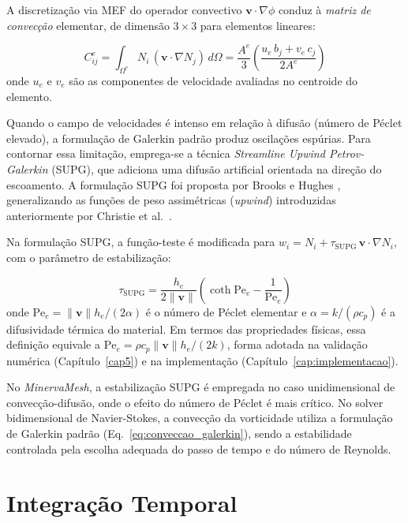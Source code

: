 A discretização via MEF do operador convectivo $\mathbf{v} \cdot \nabla \phi$ conduz à \textit{matriz de convecção} elementar, de dimensão $3 \times 3$ para elementos lineares:

\begin{equation}
C_{ij}^e = \int_{\Omega^e} N_i \, (\mathbf{v} \cdot \nabla N_j) \, d\Omega = \frac{A^e}{3} \left( \frac{u_e \, b_j + v_e \, c_j}{2 A^e} \right)
\label{eq:conveccao_galerkin}
\end{equation}
onde $u_e$ e $v_e$ são as componentes de velocidade avaliadas no centroide do elemento.

Quando o campo de velocidades é intenso em relação à difusão (número de Péclet elevado), a formulação de Galerkin padrão produz oscilações espúrias. Para contornar essa limitação, emprega-se a técnica \textit{Streamline Upwind Petrov-Galerkin} (SUPG), que adiciona uma difusão artificial orientada na direção do escoamento. A formulação SUPG foi proposta por Brooks e Hughes \cite{Brooks1982}, generalizando as funções de peso assimétricas (\textit{upwind}) introduzidas anteriormente por Christie et al.\ \cite{Christie1976}.

Na formulação SUPG, a função-teste é modificada para $w_i = N_i + \tau_{\text{SUPG}} \, \mathbf{v} \cdot \nabla N_i$, com o parâmetro de estabilização:

\begin{equation}
\tau_{\text{SUPG}} = \frac{h_e}{2 \|\mathbf{v}\|} \left( \coth \text{Pe}_e - \frac{1}{\text{Pe}_e} \right)
\label{eq:tau_supg}
\end{equation}
onde $\text{Pe}_e = \|\mathbf{v}\| h_e / (2\alpha)$ é o número de Péclet elementar e $\alpha = k/(\rho c_p)$ é a difusividade térmica do material. Em termos das propriedades físicas, essa definição equivale a $\text{Pe}_e = \rho c_p \|\mathbf{v}\| h_e / (2k)$, forma adotada na validação numérica (Capítulo~\ref{cap5}) e na implementação (Capítulo~\ref{cap:implementacao}).

No \textit{MinervaMesh}, a estabilização SUPG é empregada no caso unidimensional de convecção-difusão, onde o efeito do número de Péclet é mais crítico. No solver bidimensional de Navier-Stokes, a convecção da vorticidade utiliza a formulação de Galerkin padrão (Eq.~\ref{eq:conveccao_galerkin}), sendo a estabilidade controlada pela escolha adequada do passo de tempo e do número de Reynolds.

\section{Integração Temporal}
\label{sec:integracao_temporal}

